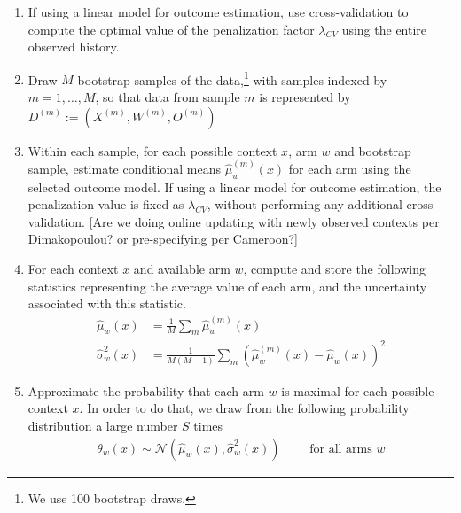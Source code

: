 \documentclass[letterpaper, 12pt, parskip=full, headsepline]{scrartcl}
\begin{document}
\begin{enumerate}
	
 \item If using a linear model for outcome estimation, use cross-validation to compute the optimal value of the penalization factor $\lambda_{CV}$ using the entire observed history.

  \item \label{step:draw} Draw $M$ bootstrap samples of the data,\footnote{We use 100 bootstrap draws.} with samples indexed by $m = 1, \dots, M$, so that data from sample $m$ is represented by $D^{(m)} := (X^{(m)}, W^{(m)}, O^{(m)})$

  \item Within each sample, for each possible context $x$, arm $w$ and bootstrap sample, estimate conditional means  $\hat{\mu}_w^{(m)}(x)$ for each arm using the selected outcome model.  If using a linear model for outcome estimation, the penalization value is fixed as $\lambda_{CV}$, without performing any additional cross-validation.
  {\color{red} [Are we doing online updating with newly observed contexts per Dimakopoulou? or pre-specifying per Cameroon?]}
  
%

  \item For each context $x$ and available arm $w$, compute and store the following statistics representing the average value of each arm, and the uncertainty associated with this statistic.
    \begin{equation}
      \begin{aligned}
        \hat{\mu}_w(x)         &= \frac{1}{M}\sum_{m} \hat{\mu}_w^{(m)}(x) \\
         \hat{\sigma}^{2}_w(x) &= \frac{1}{M(M-1)} \sum_{m} (\hat{\mu}_w^{(m)}(x) - \hat{\mu}_w(x))^2
      \end{aligned}
    \end{equation}

  \item \label{step:prob} Approximate the probability that each arm $w$ is maximal for each possible context $x$. In order to do that, we draw from the following probability distribution a large number $S$ times
  \begin{align}
    \theta_{w}(x) \sim \mathcal{N}(\hat{\mu}_w(x), \hat{\sigma}_w^{2}(x)) \qquad %
    \text{ for all arms }w
  \end{align}


\end{enumerate}
\end{document}
